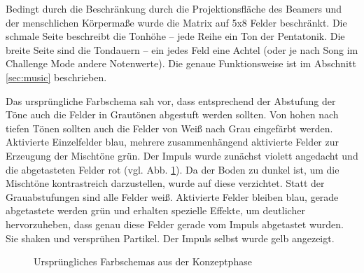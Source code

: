 
Bedingt durch die Beschränkung durch die Projektionsfläche des Beamers und der menschlichen Körpermaße wurde die Matrix auf 5x8 Felder beschränkt. Die schmale Seite beschreibt die Tonhöhe – jede Reihe ein Ton der Pentatonik. Die breite Seite sind die Tondauern – ein jedes Feld eine Achtel (oder je nach Song im Challenge Mode andere Notenwerte). Die genaue Funktionsweise ist im Abschnitt \ref{sec:music} beschrieben.

Das ursprüngliche Farbschema sah vor, dass entsprechend der Abstufung der Töne auch die Felder in Grautönen abgestuft werden sollten. Von hohen nach tiefen Tönen sollten auch die Felder von Weiß nach Grau eingefärbt werden. Aktivierte Einzelfelder blau, mehrere zusammenhängend aktivierte Felder zur Erzeugung der Mischtöne grün. Der Impuls wurde zunächst violett angedacht und die abgetasteten Felder rot (vgl. Abb. \ref{fig:design}). Da der Boden zu dunkel ist, um die Mischtöne kontrastreich darzustellen, wurde auf diese verzichtet. Statt der Grauabstufungen sind alle Felder weiß. Aktivierte Felder bleiben blau, gerade abgetastete werden grün und erhalten spezielle Effekte, um deutlicher hervorzuheben, dass genau diese Felder gerade vom Impuls abgetastet wurden. Sie shaken und versprühen Partikel. Der Impuls selbst wurde gelb angezeigt.

\begin{figure}[htbp]
\hfill
{}
\caption{Ursprüngliches Farbschemas aus der Konzeptphase}
\label{fig:design}
\end{figure}

